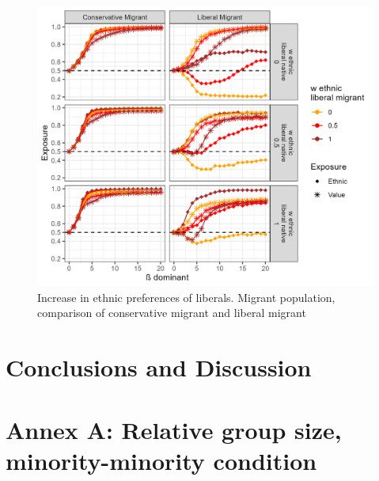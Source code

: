 \documentclass[
]{article}
\begin{document}
\begin{figure}[H]
    \centering
    \includegraphics{images/asym_migrant.jpg}
    \caption{Increase in ethnic preferences of liberals. Migrant population, comparison of conservative migrant and liberal migrant}
    \label{fig:asymmig}
\end{figure}

\section{Conclusions and Discussion}

\section{Annex A: Relative group size, minority-minority condition}
\end{document}
